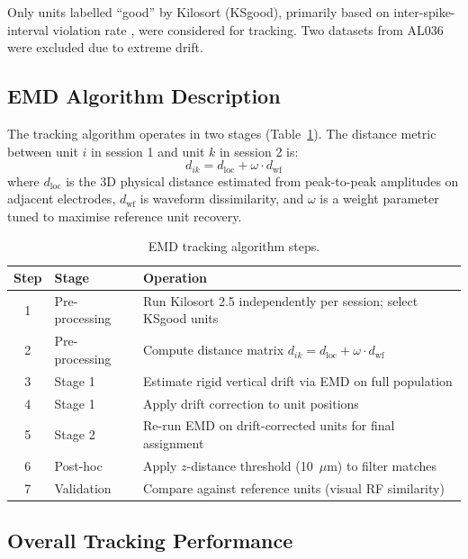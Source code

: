 \documentclass[11pt]{article}
\begin{document}
Only units labelled ``good'' by Kilosort (KSgood), primarily based on inter-spike-interval violation rate \citep{hill2011quality}, were considered for tracking. Two datasets from AL036 were excluded due to extreme drift.

\subsection{EMD Algorithm Description}

The tracking algorithm operates in two stages (Table~\ref{tab:algorithm}). The distance metric between unit $i$ in session 1 and unit $k$ in session 2 is:
\begin{equation}
d_{ik} = d_\text{loc} + \omega \cdot d_\text{wf}
\end{equation}
where $d_\text{loc}$ is the 3D physical distance estimated from peak-to-peak amplitudes on adjacent electrodes, $d_\text{wf}$ is waveform dissimilarity, and $\omega$ is a weight parameter tuned to maximise reference unit recovery.

\begin{table}[H]
\centering
\caption{EMD tracking algorithm steps.}
\label{tab:algorithm}
\begin{tabular}{@{}clp{8cm}@{}}
\toprule
Step & Stage & Operation \\
\midrule
1 & Pre-processing & Run Kilosort 2.5 independently per session; select KSgood units \\
2 & Pre-processing & Compute distance matrix $d_{ik} = d_\text{loc} + \omega \cdot d_\text{wf}$ \\
3 & Stage 1 & Estimate rigid vertical drift via EMD on full population \\
4 & Stage 1 & Apply drift correction to unit positions \\
5 & Stage 2 & Re-run EMD on drift-corrected units for final assignment \\
6 & Post-hoc & Apply $z$-distance threshold (10~$\mu$m) to filter matches \\
7 & Validation & Compare against reference units (visual RF similarity) \\
\bottomrule
\end{tabular}
\end{table}

\subsection{Overall Tracking Performance}
\end{document}

